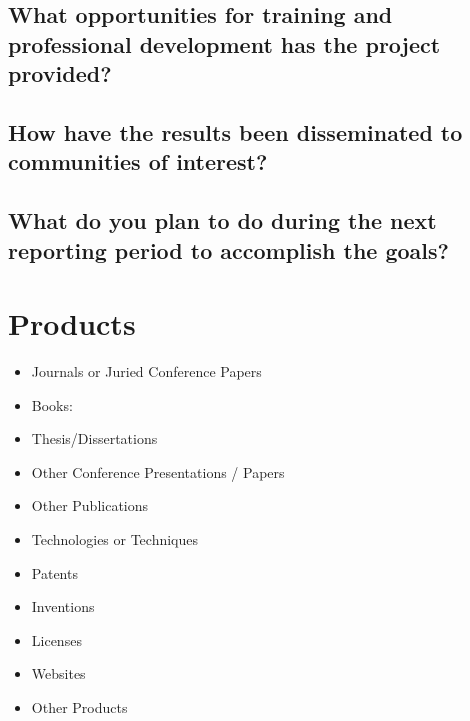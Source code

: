 \documentclass{article}
\begin{document}
\subsection*{What opportunities for training and professional development has the project provided?}
\vspace{5mm}
\subsection*{How have the results been disseminated to communities of interest? }
\vspace{5mm}
\subsection*{What do you plan to do during the next reporting period to accomplish the goals?}
\vspace{5mm}
\newpage
\section*{Products}
\begin{itemize}
\setlength{\itemsep}{5pt}
 \setlength{\parskip}{5pt}
 \setlength{\parsep}{5pt}
    \item[ ] Journals or Juried Conference Papers
    \item[ ] Books:
    \item[ ] Thesis/Dissertations
    \item[ ] Other Conference Presentations / Papers
    \item[ ] Other Publications
    \item[ ] Technologies or Techniques
    \item[ ] Patents
    \item[ ] Inventions
    \item[ ] Licenses
    \item[ ] Websites
    \item[ ] Other Products
\end{itemize}
\newpage
\end{document}
